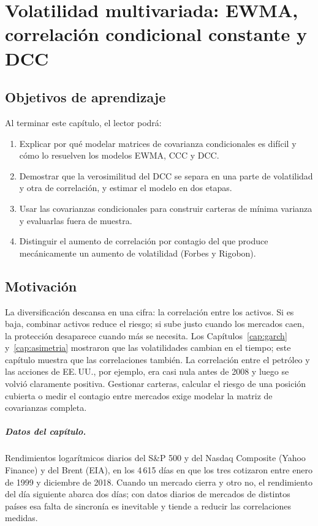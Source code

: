 \chapter[Correlaciones dinámicas]{Volatilidad multivariada: EWMA, correlación condicional constante y DCC}\label{cap:dcc}

\section*{Objetivos de aprendizaje}
Al terminar este capítulo, el lector podrá:
\begin{enumerate}[label=\arabic*.,leftmargin=*]
  \item Explicar por qué modelar matrices de covarianza condicionales es difícil y cómo lo resuelven los modelos
        EWMA, CCC y DCC.
  \item Demostrar que la verosimilitud del DCC se separa en una parte de volatilidad y otra de correlación, y
        estimar el modelo en dos etapas.
  \item Usar las covarianzas condicionales para construir carteras de mínima varianza y evaluarlas fuera de
        muestra.
  \item Distinguir el aumento de correlación por contagio del que produce mecánicamente un aumento de
        volatilidad (Forbes y Rigobon).
\end{enumerate}

\section*{Motivación}
La diversificación descansa en una cifra: la correlación entre los activos. Si es baja, combinar activos reduce
el riesgo; si sube justo cuando los mercados caen, la protección desaparece cuando más se necesita. Los
Capítulos~\ref{cap:garch} y~\ref{cap:asimetria} mostraron que las volatilidades cambian en el tiempo; este
capítulo muestra que las correlaciones también. La correlación entre el petróleo y las acciones de EE.\,UU.,
por ejemplo, era casi nula antes de 2008 y luego se volvió claramente positiva. Gestionar carteras, calcular
el riesgo de una posición cubierta o medir el contagio entre mercados exige modelar la matriz de covarianzas
completa.

\paragraph{Datos del capítulo.} Rendimientos logarítmicos diarios del S\&P 500 y del Nasdaq Composite (Yahoo
Finance) y del Brent (EIA), en los 4\,615 días en que los tres cotizaron entre enero de 1999 y diciembre de 2018.
Cuando un mercado cierra y otro no, el rendimiento del día siguiente abarca dos días; con datos diarios de
mercados de distintos países esa falta de sincronía es inevitable y tiende a reducir las correlaciones medidas.

